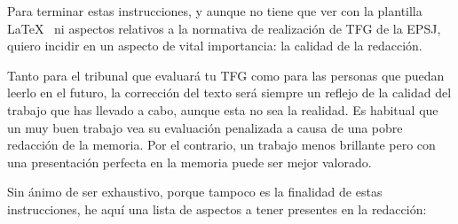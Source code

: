 Para terminar estas instrucciones, y aunque no tiene que ver con la plantilla \LaTeX~ ni aspectos relativos a la normativa de realización de TFG de la EPSJ, quiero incidir en un aspecto de vital importancia: la calidad de la redacción.

Tanto para el tribunal que evaluará tu TFG como para las personas que puedan leerlo en el futuro, la corrección del texto será siempre un reflejo de la calidad del trabajo que has llevado a cabo, aunque esta no sea la realidad. Es habitual que un muy buen trabajo vea su evaluación penalizada a causa de una pobre redacción de la memoria. Por el contrario, un trabajo menos brillante pero con una presentación perfecta en la memoria puede ser mejor valorado.

Sin ánimo de ser exhaustivo, porque tampoco es la finalidad de estas instrucciones, he aquí una lista de aspectos a tener presentes en la redacción:

